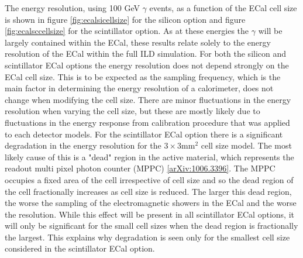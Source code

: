 The energy resolution, using 100 GeV $\gamma$ events, as a function of the ECal cell size is shown in figure \ref{fig:ecalsicellsize} for the silicon option and figure \ref{fig:ecalsccellsize} for the scintillator option.  As at these energies the $\gamma$ will be largely contained within the ECal, these results relate solely to the energy resolution of the ECal within the full ILD simulation.  For both the silicon and scintillator ECal options the energy resolution does not depend strongly on the ECal cell size.  This is to be expected as the sampling frequency, which is the main factor in determining the energy resolution of a calorimeter, does not change when modifying the cell size.  There are minor fluctuations in the energy resolution when varying the cell size, but these are mostly likely due to fluctuations in the energy response from calibration procedure that was applied to each detector models.  For the scintillator ECal option there is a significant degradation in the energy resolution for the $3 \times 3 \text{mm}^{2}$ cell size model.  The most likely cause of this is a "dead" region in the active material, which represents the readout multi pixel photon counter (MPPC) \ref{arXiv:1006.3396}.  The MPPC occupies a fixed area of the cell irrespective of cell size and so the dead region of the cell fractionally increases as cell size is reduced.  The larger this dead region, the worse the sampling of the electromagnetic showers in the ECal and the worse the resolution.  While this effect will be present in all scintillator ECal options, it will only be significant for the small cell sizes when the dead region is fractionally the largest.  This explains why degradation is seen only for the smallest cell size considered in the scintillator ECal option.     

